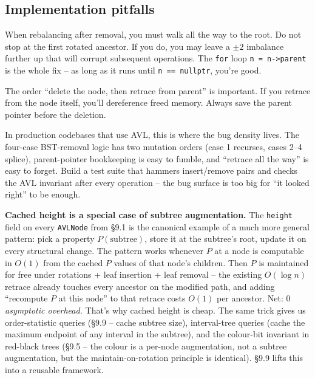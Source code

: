 \documentclass[11pt]{article}
\begin{document}
\subsection*{Implementation pitfalls}

\begin{warnbox}
When rebalancing after removal, you must walk all the way to the root. Do not stop at the first rotated ancestor. If you do, you may leave a $\pm 2$ imbalance further up that will corrupt subsequent operations. The \texttt{for} loop \texttt{n = n->parent} is the whole fix -- as long as it runs until \texttt{n == nullptr}, you're good.
\end{warnbox}

\begin{warnbox}
The order ``delete the node, then retrace from parent'' is important. If you retrace from the node itself, you'll dereference freed memory. Always save the parent pointer before the deletion.
\end{warnbox}

\begin{notebox}
In production codebases that use AVL, this is where the bug density lives. The four-case BST-removal logic has two mutation orders (case 1 recurses, cases 2--4 splice), parent-pointer bookkeeping is easy to fumble, and ``retrace all the way'' is easy to forget. Build a test suite that hammers insert/remove pairs and checks the AVL invariant after every operation -- the bug surface is too big for ``it looked right'' to be enough.
\end{notebox}

\begin{notebox}
\textbf{Cached height is a special case of subtree augmentation.}
The \texttt{height} field on every \texttt{AVLNode} from \S9.1 is
the canonical example of a much more general pattern: pick a
property $P(\text{subtree})$, store it at the subtree's root,
update it on every structural change. The pattern works whenever
$P$ at a node is computable in $O(1)$ from the cached $P$ values
of that node's children. Then $P$ is maintained for free under
rotations + leaf insertion + leaf removal -- the existing
$O(\log n)$ retrace already touches every ancestor on the modified
path, and adding ``recompute $P$ at this node'' to that retrace
costs $O(1)$ per ancestor. Net: \emph{$0$ asymptotic overhead.}
That's why cached height is cheap. The same trick gives us
order-statistic queries (\S9.9 -- cache subtree size), interval-tree
queries (cache the maximum endpoint of any interval in the
subtree), and the colour-bit invariant in red-black trees (\S9.5
-- the colour is a per-node augmentation, not a subtree
augmentation, but the maintain-on-rotation principle is identical).
\S9.9 lifts this into a reusable framework.
\end{notebox}
\end{document}
